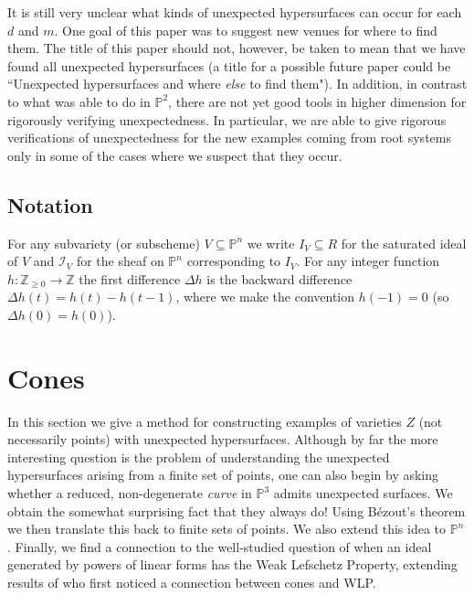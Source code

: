 \documentclass[12pt]{amsart}
\numberwithin{equation}{section}
\theoremstyle{definition}
\newcommand{\ZZ}{ \ensuremath{\mathbb{Z}}}
\newcommand{\PP}{ \ensuremath{\mathbb{P}}}
\begin{document}
It is still very unclear what kinds of unexpected hypersurfaces can occur for each $d$ and $m$.
One goal of this paper was to suggest new venues for where to find them. 
The title of this paper should not, however, be taken to mean that we have found all unexpected hypersurfaces (a title for a possible
future paper could be ``Unexpected hypersurfaces and where {\it else} to find them"). 
In addition, in contrast to what \cite{CHMN} was able to do in $\PP^2$,
there are not yet good tools in higher dimension for rigorously verifying unexpectedness.
In particular, we are able to give rigorous verifications of unexpectedness for the new examples coming from
root systems only in some of the cases where we suspect that they occur.

\subsection*{Notation}

For any subvariety (or subscheme) $V \subseteq \PP^n$ we write $I_V \subseteq R$ for the saturated ideal of $V$
and $\mathcal{I}_V$ for the sheaf on $\PP^n$ corresponding to $I_V$.
For any integer function $h : \ZZ_{\geq 0} \to \ZZ$ the first difference $\Delta h$ is
the backward difference $\Delta h(t) = h(t)-h(t-1)$, where we make the convention $h(-1)=0$ (so $\Delta h(0) = h(0)$).



\section{Cones} \label{cone section}

In this section we give a method for constructing examples of varieties $Z$ (not necessarily points) with unexpected hypersurfaces.
Although by far the more interesting question is the problem of understanding the unexpected hypersurfaces arising from a finite set 
of points, one can also begin by asking whether a reduced, non-degenerate {\em curve} in $\PP^3$ admits unexpected surfaces. We 
obtain the somewhat surprising fact that they always do! Using B\'ezout's theorem we then translate this back to finite sets of points. 
We also extend this idea to $\PP^n$. Finally, we find a connection to the well-studied question of when an ideal generated by powers 
of linear forms has the Weak Lefschetz Property, extending results of \cite{DIV} who first noticed a connection between cones and WLP.
\end{document}

